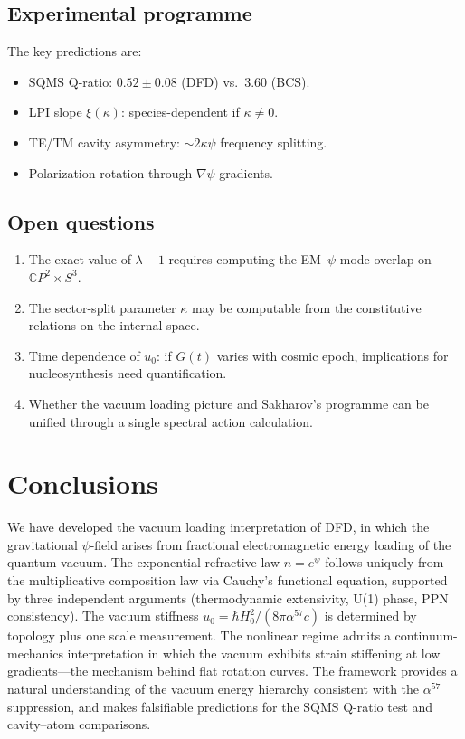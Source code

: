 \documentclass[aps,prd,twocolumn,superscriptaddress,nofootinbib]{revtex4-2}
\newcommand{\CP}{\mathbb{C}P}
\begin{document}
\subsection{Experimental programme}

The key predictions are:
\begin{itemize}
\item SQMS Q-ratio: $0.52 \pm 0.08$ (DFD) vs.\ $3.60$ (BCS).
\item LPI slope $\xi(\kappa)$: species-dependent if $\kappa \neq 0$.
\item TE/TM cavity asymmetry: $\sim 2\kappa\psi$ frequency splitting.
\item Polarization rotation through $\nabla\psi$ gradients.
\end{itemize}

\subsection{Open questions}

\begin{enumerate}
\item The exact value of $\lambda - 1$ requires computing the
EM--$\psi$ mode overlap on $\CP^2 \times S^3$.
\item The sector-split parameter $\kappa$ may be computable from the
constitutive relations on the internal space.
\item Time dependence of $u_0$: if $G(t)$ varies with cosmic epoch,
implications for nucleosynthesis need quantification.
\item Whether the vacuum loading picture and Sakharov's programme can
be unified through a single spectral action calculation.
\end{enumerate}


\section{Conclusions}
\label{sec:conclusions}

We have developed the vacuum loading interpretation of DFD, in which
the gravitational $\psi$-field arises from fractional electromagnetic
energy loading of the quantum vacuum.  The exponential refractive law
$n = e^\psi$ follows uniquely from the multiplicative composition law
via Cauchy's functional equation, supported by three independent
arguments (thermodynamic extensivity, U(1) phase, PPN consistency).
The vacuum stiffness $u_0 = \hbar H_0^2/(8\pi\alpha^{57}c)$ is
determined by topology plus one scale measurement.  The nonlinear
regime admits a continuum-mechanics interpretation in which the vacuum
exhibits strain stiffening at low gradients---the mechanism behind
flat rotation curves.  The framework provides a natural understanding
of the vacuum energy hierarchy consistent with the $\alpha^{57}$
suppression, and makes falsifiable predictions for the SQMS Q-ratio
test and cavity--atom comparisons.
\end{document}
